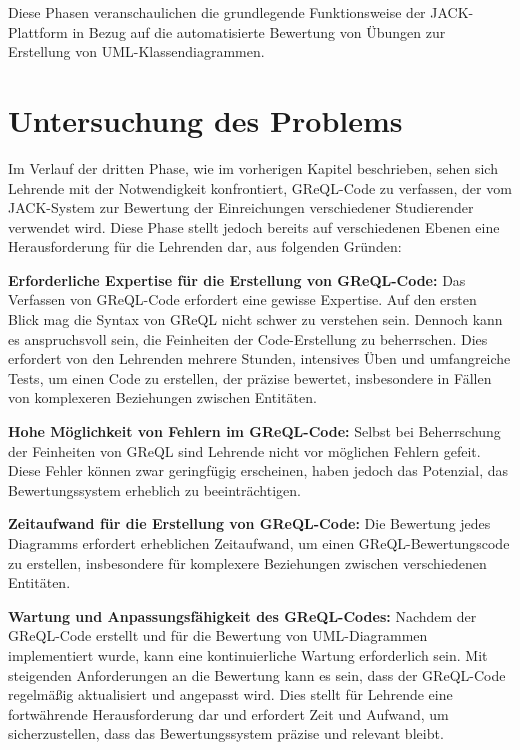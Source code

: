 Diese Phasen veranschaulichen die grundlegende Funktionsweise der JACK-Plattform in Bezug auf die automatisierte Bewertung von Übungen zur Erstellung von UML-Klassendiagrammen.


\section{Untersuchung des Problems}

Im Verlauf der dritten Phase, wie im vorherigen Kapitel beschrieben, sehen sich Lehrende mit der Notwendigkeit konfrontiert, GReQL-Code zu verfassen, der vom JACK-System zur Bewertung der Einreichungen verschiedener Studierender verwendet wird. Diese Phase stellt jedoch bereits auf verschiedenen Ebenen eine Herausforderung für die Lehrenden dar, aus folgenden Gründen:

\vspace{0.5cm}

\textbf{Erforderliche Expertise für die Erstellung von GReQL-Code:}
Das Verfassen von GReQL-Code erfordert eine gewisse Expertise. Auf den ersten Blick mag die Syntax von GReQL nicht schwer zu verstehen sein. Dennoch kann es anspruchsvoll sein, die Feinheiten der Code-Erstellung zu beherrschen. Dies erfordert von den Lehrenden mehrere Stunden, intensives Üben und umfangreiche Tests, um einen Code zu erstellen, der präzise bewertet, insbesondere in Fällen von komplexeren Beziehungen zwischen Entitäten.

\vspace{0.5cm}

\textbf{Hohe Möglichkeit von Fehlern im GReQL-Code:}
Selbst bei Beherrschung der Feinheiten von GReQL sind Lehrende nicht vor möglichen Fehlern gefeit. Diese Fehler können zwar geringfügig erscheinen, haben jedoch das Potenzial, das Bewertungssystem erheblich zu beeinträchtigen.

\vspace{0.5cm}

\textbf{Zeitaufwand für die Erstellung von GReQL-Code:}
Die Bewertung jedes Diagramms erfordert erheblichen Zeitaufwand, um einen GReQL-Bewertungscode zu erstellen,
insbesondere für komplexere Beziehungen zwischen verschiedenen Entitäten.

\vspace{0.5cm}

\textbf{Wartung und Anpassungsfähigkeit des GReQL-Codes:}
Nachdem der GReQL-Code erstellt und für die Bewertung von UML-Diagrammen implementiert wurde, kann eine kontinuierliche
Wartung erforderlich sein. Mit steigenden Anforderungen an die Bewertung kann es sein, dass der GReQL-Code regelmäßig
aktualisiert und angepasst wird. Dies stellt für Lehrende eine fortwährende Herausforderung dar und erfordert Zeit und
Aufwand, um sicherzustellen, dass das Bewertungssystem präzise und relevant bleibt.

